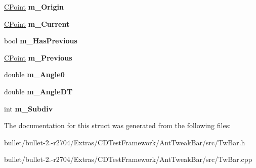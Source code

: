 \begin{DoxyCompactItemize}
\item 
\hypertarget{struct_c_tw_bar_1_1_c_roto_slider_a6f267d43e99c0845f4653669018889f1}{\hyperlink{struct_c_tw_bar_1_1_c_point}{C\+Point} {\bfseries m\+\_\+\+Origin}}\label{struct_c_tw_bar_1_1_c_roto_slider_a6f267d43e99c0845f4653669018889f1}

\item 
\hypertarget{struct_c_tw_bar_1_1_c_roto_slider_ac677f16cb06ad64ef568a946da1ac9b2}{\hyperlink{struct_c_tw_bar_1_1_c_point}{C\+Point} {\bfseries m\+\_\+\+Current}}\label{struct_c_tw_bar_1_1_c_roto_slider_ac677f16cb06ad64ef568a946da1ac9b2}

\item 
\hypertarget{struct_c_tw_bar_1_1_c_roto_slider_a2e33b15c91a81bfeadc43159dfa416ec}{bool {\bfseries m\+\_\+\+Has\+Previous}}\label{struct_c_tw_bar_1_1_c_roto_slider_a2e33b15c91a81bfeadc43159dfa416ec}

\item 
\hypertarget{struct_c_tw_bar_1_1_c_roto_slider_ad39d89c53f493c9ba79a0aa81423ea5f}{\hyperlink{struct_c_tw_bar_1_1_c_point}{C\+Point} {\bfseries m\+\_\+\+Previous}}\label{struct_c_tw_bar_1_1_c_roto_slider_ad39d89c53f493c9ba79a0aa81423ea5f}

\item 
\hypertarget{struct_c_tw_bar_1_1_c_roto_slider_a8241d63ec558a6d1280a5365926289df}{double {\bfseries m\+\_\+\+Angle0}}\label{struct_c_tw_bar_1_1_c_roto_slider_a8241d63ec558a6d1280a5365926289df}

\item 
\hypertarget{struct_c_tw_bar_1_1_c_roto_slider_a5993b4201729c617cfff069a55bc2712}{double {\bfseries m\+\_\+\+Angle\+D\+T}}\label{struct_c_tw_bar_1_1_c_roto_slider_a5993b4201729c617cfff069a55bc2712}

\item 
\hypertarget{struct_c_tw_bar_1_1_c_roto_slider_a2b552c84eadc257d3b82e418ad865242}{int {\bfseries m\+\_\+\+Subdiv}}\label{struct_c_tw_bar_1_1_c_roto_slider_a2b552c84eadc257d3b82e418ad865242}

\end{DoxyCompactItemize}


The documentation for this struct was generated from the following files\+:\begin{DoxyCompactItemize}
\item 
bullet/bullet-\/2.-\/r2704/\+Extras/\+C\+D\+Test\+Framework/\+Ant\+Tweak\+Bar/src/Tw\+Bar.\+h\item 
bullet/bullet-\/2.-\/r2704/\+Extras/\+C\+D\+Test\+Framework/\+Ant\+Tweak\+Bar/src/Tw\+Bar.\+cpp\end{DoxyCompactItemize}
